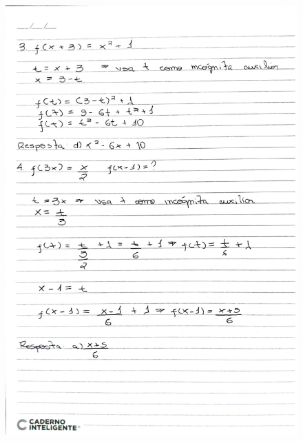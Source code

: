 \documentclass[
  12pt,     %
  openright,      %
  oneside,      %
  a4paper     %
  ]{abntex2}
\begin{document}
\begin{figure}[H]
  \centering
  \includegraphics[scale=0.23]{pagina12.jpg}
\end{figure}
\end{document}

